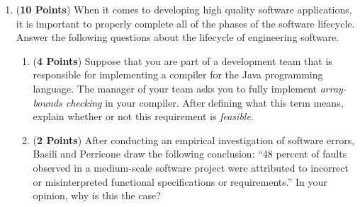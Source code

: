 \documentclass[12pt,epsf,psfig,graphicx]{article}
\begin{document}
\begin{enumerate}
\begin{enumerate}
\end{enumerate}

\newpage

\item ({\bf 10 Points}) When it comes to developing high quality
  software applications, it is important to properly complete all of
  the phases of the software lifecycle.  Answer the following
  questions about the lifecycle of engineering software.

\begin{enumerate}

\item ({\bf 4 Points}) Suppose that you are part of a development team
  that is responsible for implementing a compiler for the Java
  programming language.  The manager of your team asks you to fully
  implement {\em array-bounds checking} in your compiler.  After
  defining what this term means, explain whether or not this
  requirement is {\em feasible}.

\item ({\bf 2 Points}) After conducting an empirical investigation of
  software errors, Basili and Perricone draw the following conclusion:
  ``48 percent of faults observed in a medium-scale software project
  were attributed to incorrect or misinterpreted functional
  specifications or requirements.''  In your opinion, why is this the
  case?


\end{enumerate}
\end{enumerate}
\end{document}
